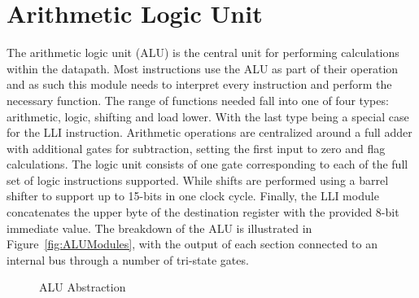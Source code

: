

\section{Arithmetic Logic Unit}\label{sect:design:alu}

The arithmetic logic unit (ALU) is the central unit for performing calculations within the datapath. 
Most instructions use the ALU as part of their operation and as such this module needs to interpret every instruction and perform the necessary function. 
The range of functions needed fall into one of four types: arithmetic, logic, shifting and load lower. 
With the last type being a special case for the LLI instruction. 
Arithmetic operations are centralized around a full adder with additional gates for subtraction, setting the first input to zero and flag calculations. 
The logic unit consists of one gate corresponding to each of the full set of logic instructions supported. 
While shifts are performed using a barrel shifter to support up to 15-bits in one clock cycle. 
Finally, the LLI module concatenates the upper byte of the destination register with the provided 8-bit immediate value. 
The breakdown of the ALU is illustrated in Figure~\ref{fig:ALUModules}, with the output of each section connected to an internal bus through a number of tri-state gates. 


\begin{figure}[h]
	\centering
	\caption{ALU Abstraction}
	\label{fig:ALUAbsract}
\end{figure}

